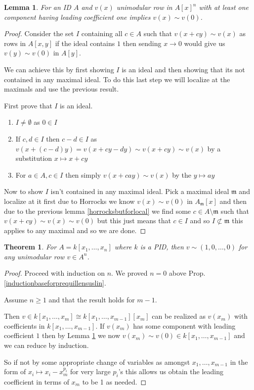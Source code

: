 \documentclass[12pt]{article}
\numberwithin{equation}{section}
\newcounter{dummy} \numberwithin{dummy}{section}
\newtheorem{theorem}[dummy]{Theorem}
\newtheorem{lemma}[dummy]{Lemma}
\begin{document}
	\begin{lemma}\label{horrocksbuteverything}
		For an ID $A$ and $v(x)$ unimodular row in $A[x]^n$ with at least one component having leading coefficient one implies $v(x) \sim v(0)$.
	\end{lemma}
	\begin{proof}
		Consider the set $I$ containing all $c \in A$ such that $v(x+cy)\sim v(x)$ as rows in $A[x,y]$ if the ideal contains $1$ then sending $x \to 0$ would give us $v(y)\sim v(0) $ in $A[y].$
		
		We can achieve this by first showing $I$ is an ideal and then showing that its not contained in any maximal ideal.	To do this last step we will localize at the maximals and use the previous result.
		
		First prove that $I$ is an ideal.
		\begin{enumerate}
			\item $I \neq \emptyset $ as $0 \in I$
			\item If $c,d \in I$ then $c-d \in I$ as $v(x+(c-d)y)=v(x+cy-dy) \sim v(x+cy) \sim v(x)$ by a substitution $x \mapsto x+cy$
			\item For $a \in A, c \in I$ then simply $v(x+cay) \sim v(x)$ by the $y \mapsto ay$
		\end{enumerate}
		
		Now to show $I$ isn't contained in any maximal ideal. Pick a maximal ideal $\mathfrak m$ and localize at it first due to Horrocks we know $v(x) \sim v(0) $ in $A_{\mathfrak m} [x]$ and then due to the previous lemma \ref{horrocksbutforlocal} we find some $c \in A\setminus \mathfrak m$ such that $v(x+cy) \sim v(x) \sim v(0)$ but this just means that $ c \in I$ and so $I\not \subset \mathfrak m$ this applies to any maximal and so we are done.  
	\end{proof}
	
	\begin{theorem}
		For $A=k[x_1, \dots, x_n]$ where $k $ is a PID, then $v \sim (1,0,\dots, 0)$ for any unimodular row $v \in A^n$.
	\end{theorem}
	\begin{proof}
		Proceed with induction on $n$. We proved $n=0$ above Prop. \ref{inductionbaseforprequillensuslin}.
		
		Assume $n\geq 1$ and that the result holds for $m-1$.
		
		Then $v \in k[x_1, \dots, x_m] \cong k[x_1,\dots, x_{m-1}] [x_m]$ can be realized as $v(x_m) $ with coefficients in $k[x_1,\dots, x_{m-1}]$. If $v(x_m)$ has some component with leading coefficient $1$ then by Lemma \ref{horrocksbuteverything} we now $v(x_m) \sim v(0) \in k[x_1, \dots, x_{m-1}]$ and we can reduce by induction.
		
		So if not by some appropriate change of variables as amongst $x_1, \dots, x_{m-1}$ in the form of $x_i \mapsto x_i-x_m^{p_i}$ for very large $p_i$'s this allows us obtain the leading coefficient in terms of $x_m$ to be 1 as needed.
	\end{proof}
\end{document}
